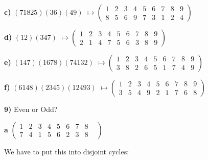 \documentclass{article}
\begin{document}
					\bigskip

\hspace{.3in}\textbf{c)}
$(71825)(36)(49)$             $\mapsto (\begin{smallmatrix}
					1 & 2 & 3 & 4 & 5 & 6 & 7 & 8 & 9 \\
					 8& 5 & 6 & 9 & 7 & 3 & 1 & 2 & 4
					\end{smallmatrix})$ 
					
					 \bigskip
\hspace{.3in}\textbf{d)}
$(12)(347)$            		 $\mapsto (\begin{smallmatrix}
					1 & 2 & 3 & 4 & 5 & 6 & 7 & 8 & 9\\
					2 & 1 & 4 & 7 & 5 & 6 & 3 & 8 & 9
					\end{smallmatrix})$ 
					
					 \bigskip

\hspace{.3in}\textbf{e)}
$(147)(1678)(74132)$     $\mapsto (\begin{smallmatrix}
					1 & 2 & 3 & 4 & 5 & 6 & 7 & 8 & 9 \\
					3 & 8 & 2 & 6 & 5 & 1 & 7 & 4 & 9
					\end{smallmatrix})$ 
					
					\bigskip
					
					
					
\hspace{.3in}\textbf{f)}
$(6148)(2345)(12493)$   $\mapsto (\begin{smallmatrix}
					1 & 2 & 3 & 4 & 5 & 6 & 7 & 8 & 9 \\
					3 & 5 & 4 & 9 & 2 & 1 & 7 & 6 & 8
					\end{smallmatrix})$
					
					




\newpage



\textbf{9)} Even or Odd?


\medskip

\hspace{.2in}\textbf{a}
$(\begin{smallmatrix}
1 & 2 & 3 & 4 & 5 & 6 & 7 & 8 & \\
7 & 4 & 1 & 5 & 6 & 2 & 3 & 8 &
\end{smallmatrix})$

\medskip

We have to put this into disjoint cycles:
\end{document}
